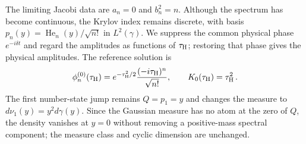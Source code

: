 \documentclass[a4paper,11pt]{article}
\def\dd{d}%
\def\ii{i}%
\def\ee{e}%
\theoremstyle{definition}
\theoremstyle{remark}
\newcommand{\dd}{\mathrm d}
\newcommand{\ii}{\mathrm i}
\newcommand{\ee}{\mathrm e}
\newcommand{\He}{\operatorname{He}}
\begin{document}
The limiting Jacobi data are $a_n=0$ and $b_n^2=n$. Although the spectrum has become continuous, the Krylov index remains discrete, with basis $p_n(y)=\He_n(y)/\sqrt{n!}$ in $L^2(\gamma)$. We suppress the common physical phase $\ee^{-\ii\delta t}$ and regard the amplitudes as functions of $\tau_{\rm H}$; restoring that phase gives the physical amplitudes. The reference solution is
\begin{equation}
   \phi_n^{(0)}(\tau_{\rm H})=\ee^{-\tau_{\rm H}^2/2}
   \frac{(-\ii\tau_{\rm H})^n}{\sqrt{n!}},
   \qquad
   K_0(\tau_{\rm H})=\tau_{\rm H}^2\,.
   \label{eq:Hermite-reference-amplitudes-app}
\end{equation}
The first number-state jump remains $Q=p_1=y$ and changes the measure to
$
   \dd\nu_1(y)=y^2\dd\gamma(y).
$ 
Since the Gaussian measure has no atom at the zero of $Q$, the density vanishes at $y=0$ without removing a positive-mass spectral component; the measure class and cyclic dimension are unchanged.
\end{document}
